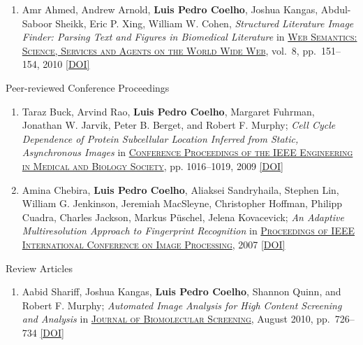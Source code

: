 \documentclass{article}
\renewcommand\subsubsection[1]{%
    \par\vspace{.1em}%
    {\hspace{1em}\subsubsubhead #1}%
    \par\vspace{.2em}%
}
\newcommand\showdoi[1]{%
    \href{http://dx.doi.org/#1}{[DOI]}%
}
\newcommand\pubname[1]{\textsc{\uline{#1}}}
\newcommand\contribution[1]{\relax}
\begin{document}
\begin{enumerate}[resume]
\item Amr Ahmed, Andrew Arnold, \textbf{Luis Pedro Coelho}, Joshua Kangas,
Abdul-Saboor Sheikk, Eric P. Xing, William W. Cohen, \emph{Structured
Literature Image Finder: Parsing Text and Figures in Biomedical Literature} in
\pubname{Web Semantics: Science, Services and Agents on the World Wide Web},
vol.\ 8, pp.\ 151--154, 2010 \showdoi{10.1016/j.websem.2010.04.002}
\end{enumerate}

\subsubsection{Peer-reviewed Conference Proceedings}

\begin{enumerate}[resume]

\item Taraz Buck, Arvind Rao, \textbf{Luis Pedro Coelho}, Margaret Fuhrman,
Jonathan W. Jarvik, Peter B. Berget, and Robert F. Murphy; \emph{Cell Cycle
Dependence of Protein Subcellular Location Inferred from Static, Asynchronous
Images} in \pubname{Conference Proceedings of the IEEE Engineering in Medical
and Biology Society}, pp. 1016--1019, 2009 \showdoi{10.1109/IEMBS.2009.5332888}
\contribution{I helped the first author acquire relevant microscopy data.}

\item Amina Chebira, \textbf{Luis Pedro Coelho}, Aliaksei Sandryhaila, Stephen
Lin, William G. Jenkinson, Jeremiah MacSleyne, Christopher Hoffman, Philipp
Cuadra, Charles Jackson, Markus Püschel, Jelena Kovacevick; \emph{An Adaptive
Multiresolution Approach to Fingerprint Recognition} in \pubname{Proceedings of
IEEE International Conference on Image Processing}, 2007
\showdoi{10.1109/ICIP.2007.4378990}
\contribution{I developed and implemented one of the methods presented in the
paper.}

\end{enumerate}

\subsubsection{Review Articles}
\begin{enumerate}[resume]

\item Aabid Shariff, Joshua Kangas, \textbf{Luis Pedro Coelho}, Shannon Quinn,
and Robert F. Murphy; \emph{Automated Image Analysis for High Content Screening
and Analysis} in \pubname{Journal of Biomolecular Screening}, August 2010, pp.\
726--734 \showdoi{10.1177/1087057110370894}
\end{enumerate}
\end{document}
